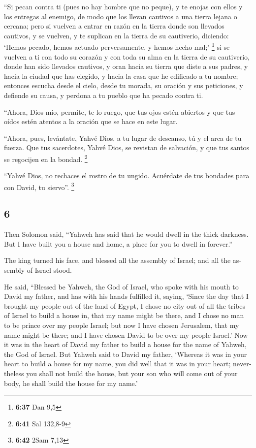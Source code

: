 \begin{paracol}{2}
 ``Si pecan contra ti (pues no hay hombre que no peque),
y te enojas con ellos y los entregas al enemigo, de modo que los llevan
cautivos a una tierra lejana o cercana;  pero si vuelven
a entrar en razón en la tierra donde son llevados cautivos, y se
vuelven, y te suplican en la tierra de su cautiverio, diciendo: `Hemos
pecado, hemos actuado perversamente, y hemos hecho mal;' \footnote{\textbf{6:37}
  Dan 9,5}  si se vuelven a ti con todo su corazón y con
toda su alma en la tierra de su cautiverio, donde han sido llevados
cautivos, y oran hacia su tierra que diste a sus padres, y hacia la
ciudad que has elegido, y hacia la casa que he edificado a tu nombre;
 entonces escucha desde el cielo, desde tu morada, su
oración y sus peticiones, y defiende su causa, y perdona a tu pueblo que
ha pecado contra ti.

 ``Ahora, Dios mío, permite, te lo ruego, que tus ojos
estén abiertos y que tus oídos estén atentos a la oración que se hace en
este lugar.

 ``Ahora, pues, levántate, Yahvé Dios, a tu lugar de
descanso, tú y el arca de tu fuerza. Que tus sacerdotes, Yahvé Dios, se
revistan de salvación, y que tus santos se regocijen en la bondad.
\footnote{\textbf{6:41} Sal 132,8-9}

 ``Yahvé Dios, no rechaces el rostro de tu ungido.
Acuérdate de tus bondades para con David, tu siervo''. \footnote{\textbf{6:42}
  2Sam 7,13}

\switchcolumn
\begin{otherlanguage}{english}

\hypertarget{section-11}{%
\section{6}\label{section-11}}

 Then Solomon said, ``Yahweh has said that he would dwell
in the thick darkness.  But I have built you a house and
home, a place for you to dwell in forever.''

 The king turned his face, and blessed all the assembly of
Israel; and all the assembly of Israel stood.

 He said, ``Blessed be Yahweh, the God of Israel, who
spoke with his mouth to David my father, and has with his hands
fulfilled it, saying,  `Since the day that I brought my
people out of the land of Egypt, I chose no city out of all the tribes
of Israel to build a house in, that my name might be there, and I chose
no man to be prince over my people Israel;  but now I have
chosen Jerusalem, that my name might be there; and I have chosen David
to be over my people Israel.'  Now it was in the heart of
David my father to build a house for the name of Yahweh, the God of
Israel.  But Yahweh said to David my father, `Whereas it
was in your heart to build a house for my name, you did well that it was
in your heart;  nevertheless you shall not build the
house, but your son who will come out of your body, he shall build the
house for my name.'


\end{otherlanguage}
\end{paracol}
